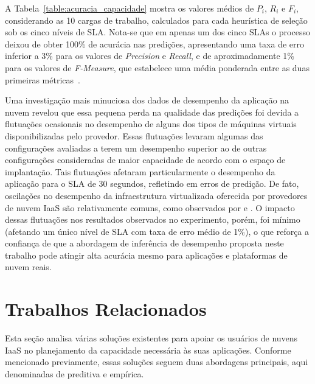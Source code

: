\documentclass[12pt]{article}
\begin{document}
A Tabela~\ref{table:acuracia_capacidade} mostra os valores médios de $P_{i}$, $R_{i}$ e $F_{i}$, considerando as 10 cargas de trabalho, calculados para cada heurística de seleção sob os cinco níveis de SLA. Nota-se que em apenas um dos cinco SLAs o processo deixou de obter 100\% de acurácia nas predições, apresentando uma taxa de erro inferior a 3\% para os valores de {\em Precision} e {\em Recall}, e de aproximadamente 1\% para os valores de \emph{F-Measure}, que estabelece uma média ponderada entre as duas primeiras métricas~\cite{Baeza-Yates1999}. 

Uma investigação mais minuciosa dos dados de desempenho da aplicação na nuvem revelou que essa pequena perda na qualidade das predições foi devida a flutuações ocasionais no desempenho de alguns dos tipos de máquinas virtuais disponibilizadas pelo provedor. Essas flutuações levaram algumas das configurações avaliadas a terem um desempenho superior ao de outras configurações consideradas de maior capacidade de acordo com o espaço de implantação. Tais flutuações afetaram particularmente o desempenho da aplicação para o SLA de 30 segundos, refletindo em erros de predição. De fato, oscilações no desempenho da infraestrutura virtualizada oferecida por provedores de nuvem IaaS são relativamente comuns, como observados por \cite{iosup2011performance} e \cite{cunha2011investigating}. O impacto dessas flutuações nos resultados observados no experimento, porém, foi mínimo (afetando um único nível de SLA com taxa de erro médio de 1\%), o que reforça a confiança de que a abordagem de inferência de desempenho proposta neste trabalho pode atingir alta acurácia mesmo para aplicações e plataformas de nuvem reais.  


\section{Trabalhos Relacionados}\label{sec:related-work}

Esta seção analisa várias soluções existentes para apoiar os usuários de nuvens IaaS no planejamento da capacidade necessária às suas aplicações. Conforme mencionado previamente, essas soluções seguem duas abordagens principais, aqui denominadas de preditiva e empírica. 

\end{document}

